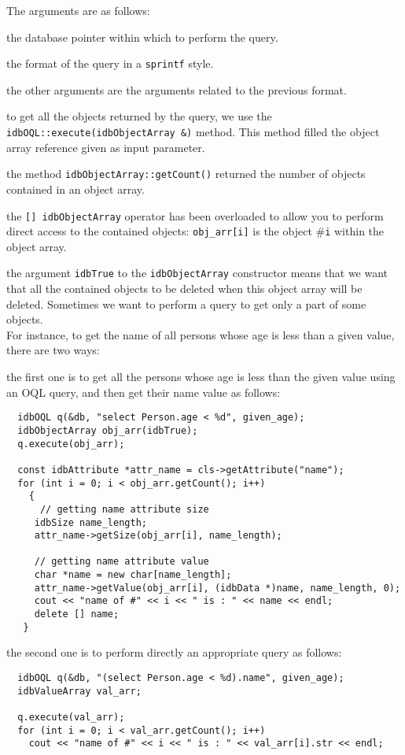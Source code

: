 The arguments are as follows:
\be
\item the database pointer within which to perform the query.
\item the format of the query in a \texttt{sprintf} style.
\item the other arguments are the arguments related to the previous
format.
\ee
\item to get all the objects returned by the query, we use the
\texttt{idbOQL::execute(idbObjectArray \&)} method. This method filled
the object array reference given as input parameter.
\item the method \texttt{idbObjectArray::getCount()} returned the number
of objects contained in an object array.
\item the \texttt{[] idbObjectArray} operator has been overloaded to
allow you to perform direct access to the contained objects: \texttt{obj\_arr[i]} is
the object \#\texttt{i} within the object array.
\item the argument \texttt{idbTrue} to the \texttt{idbObjectArray} constructor
means that we want that all the contained objects to be deleted
when this object array will be deleted.
\ee
Sometimes we want to perform a query to get only a part of some objects.
\\
For instance, to get the name of all persons whose age is less than
a given value, there are two ways:
\be
\item the first one is to get all the persons whose age is less
than the given value using an OQL query, and then get their name value
as follows:
\verbsize
\begin{verbatim}
  idbOQL q(&db, "select Person.age < %
  idbObjectArray obj_arr(idbTrue);
  q.execute(obj_arr);

  const idbAttribute *attr_name = cls->getAttribute("name");
  for (int i = 0; i < obj_arr.getCount(); i++)
    {
      // getting name attribute size
     idbSize name_length;
     attr_name->getSize(obj_arr[i], name_length);

     // getting name attribute value
     char *name = new char[name_length];
     attr_name->getValue(obj_arr[i], (idbData *)name, name_length, 0);
     cout << "name of #" << i << " is : " << name << endl;
     delete [] name;
   }  
\end{verbatim}
\normalsize
\item the second one is to perform directly an appropriate query as follows:
\verbsize
\begin{verbatim}
  idbOQL q(&db, "(select Person.age < %
  idbValueArray val_arr;

  q.execute(val_arr);
  for (int i = 0; i < val_arr.getCount(); i++)
    cout << "name of #" << i << " is : " << val_arr[i].str << endl;
\end{verbatim}
